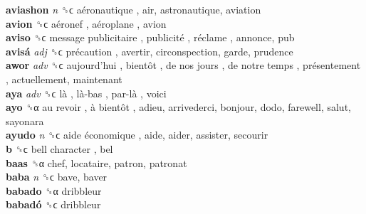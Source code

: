 \textbf{aviashon} \emph{n}  ␝ϲ   aéronautique , air, astronautique, aviation  \\
\textbf{avion} ␝ϲ   aéronef ,  aéroplane , avion  \\
\textbf{aviso} ␝ϲ   message publicitaire ,  publicité ,  réclame , annonce, pub  \\
\textbf{avisá} \emph{adj}  ␝ϲ   précaution , avertir, circonspection, garde, prudence  \\
\textbf{awor} \emph{adv}  ␝ϲ   aujourd’hui ,  bientôt ,  de nos jours ,  de notre temps ,  présentement , actuellement, maintenant  \\
\textbf{aya} \emph{adv}  ␝ϲ   là ,  là-bas ,  par-là , voici  \\
\textbf{ayo} ␝α   au revoir ,  à bientôt , adieu, arrivederci, bonjour, dodo, farewell, salut, sayonara  \\
\textbf{ayudo} \emph{n}  ␝ϲ   aide économique , aide, aider, assister, secourir  \\
\textbf{b} ␝ϲ   bell character , bel  \\
\textbf{baas} ␝α  chef, locataire, patron, patronat  \\
\textbf{baba} \emph{n}  ␝ϲ  bave, baver  \\
\textbf{babado} ␝α  dribbleur  \\
\textbf{babadó} ␝ϲ  dribbleur  \\
